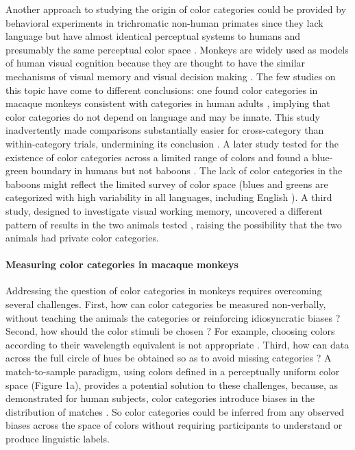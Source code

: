 \documentclass[9pt,biorxiv,lineno,onehalfspacing]{lapreprint}
\begin{document}
\begin{refsection}
Another approach to studying the origin of color categories could be provided by behavioral experiments in trichromatic non-human primates \citep{sandell_color_1979,carey_where_2009,RN18699,siuda-krzywicka_biological_2019} since they lack language but have almost identical perceptual systems to humans and presumably the same perceptual color space \citep{schnapf_spectral_1987,stoughton_psychophysical_2012,gagin_color-detection_2014, horwitz_what_2015}. Monkeys are widely used as models of human visual cognition because they are thought to have the similar mechanisms of visual memory and visual decision making \citep{panichello_error-correcting_2019,horwitz_what_2015}. The few studies on this topic have come to different conclusions: one found color categories in macaque monkeys consistent with categories in human adults \citep{sandell_color_1979}, implying that color categories do not depend on language and may be innate.
This study inadvertently made comparisons substantially easier for cross-category than within-category trials, undermining its conclusion \citep{davidoff_cross-species_2010}. 
A later study tested for the existence of color categories across a limited range of colors and found a blue-green boundary in humans but not baboons \citep{fagot_cross-species_2006,RN18699}. The lack of color categories in the baboons might reflect the limited survey of color space (blues and greens are categorized with high variability in all languages, including English \citep{gibson_color_2017}). A third study, designed to investigate visual working memory, uncovered a different pattern of results in the two animals tested \citep{panichello_error-correcting_2019}, raising the possibility that the two animals had private color categories. 

\paragraph{Measuring color categories in macaque monkeys}

Addressing the question of color categories in monkeys requires overcoming several challenges. 
First, how can color categories be measured non-verbally, without teaching the animals the categories or reinforcing idiosyncratic biases \citep{essock_color_1977,matsuno_color_2004}? 
Second, how should the color stimuli be chosen \citep{siuda-krzywicka_biological_2019}?
For example, choosing colors according to their wavelength equivalent 
\citep{sandell_color_1979} is not appropriate 
\citep{davidoff_cross-species_2010}.
Third, how can data across the full circle of hues be obtained so as to avoid missing categories \citep{fagot_cross-species_2006}? 
A match-to-sample paradigm, using colors defined in a perceptually uniform color space \citep{stockman_colorimetry_2010} (Figure 1a), provides a potential solution to these challenges, because, as demonstrated for human subjects, color categories introduce biases in the distribution of matches \citep{bae_why_2015}. 
So color categories could be inferred from any observed biases across the space of colors without requiring participants to understand or produce linguistic labels.  


\end{refsection}
\end{document}
